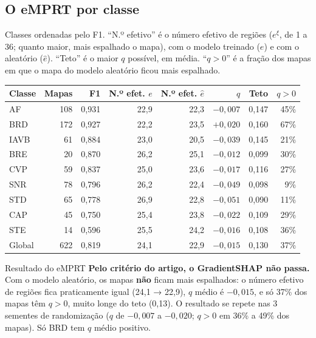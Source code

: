 \documentclass[11pt,a4paper]{article}
\begin{document}
\subsection{O eMPRT por classe}
Classes ordenadas pelo F1. “N.º efetivo” é o número efetivo de regiões ($e^{\xi}$, de 1 a 36; quanto maior, mais espalhado o mapa), com o modelo treinado ($e$) e com o aleatório ($\hat{e}$). “Teto” é o maior $q$ possível, em média. “$q > 0$” é a fração dos mapas em que o mapa do modelo aleatório ficou mais espalhado.
\begin{center}\small
\setlength{\tabcolsep}{5pt}
\begin{tabular}{lrrrrrrr}
\toprule
\textbf{Classe} & \textbf{Mapas} & \textbf{F1} & \textbf{N.º efet. $e$} & \textbf{N.º efet. $\hat{e}$} & \textbf{$q$} & \textbf{Teto} & \textbf{$q > 0$} \\
\midrule
AF   & 108 & 0,931 & 22,9 & 22,3 & $-0{,}007$ & 0,147 & 45\% \\
BRD  & 172 & 0,927 & 22,2 & 23,5 & $+0{,}020$ & 0,160 & 67\% \\
IAVB &  61 & 0,884 & 23,0 & 20,5 & $-0{,}039$ & 0,145 & 21\% \\
BRE  &  20 & 0,870 & 26,2 & 25,1 & $-0{,}012$ & 0,099 & 30\% \\
CVP  &  59 & 0,837 & 25,0 & 23,6 & $-0{,}017$ & 0,116 & 27\% \\
SNR  &  78 & 0,796 & 26,2 & 22,4 & $-0{,}049$ & 0,098 &  9\% \\
STD  &  65 & 0,778 & 26,9 & 22,8 & $-0{,}051$ & 0,090 & 11\% \\
CAP  &  45 & 0,750 & 25,4 & 23,8 & $-0{,}022$ & 0,109 & 29\% \\
STE  &  14 & 0,596 & 25,5 & 24,2 & $-0{,}016$ & 0,108 & 36\% \\
\midrule
Global & 622 & 0,819 & 24,1 & 22,9 & $-0{,}015$ & 0,130 & 37\% \\
\bottomrule
\end{tabular}
\end{center}

\begin{infobox}[warn]{Resultado do eMPRT}
\textbf{Pelo critério do artigo, o GradientSHAP não passa.} Com o modelo aleatório, os mapas \textbf{não} ficam mais espalhados: o número efetivo de regiões fica praticamente igual (24,1 → 22,9), $q$ médio é $-0{,}015$, e só 37\% dos mapas têm $q > 0$, muito longe do teto (0,13). O resultado se repete nas 3 sementes de randomização ($q$ de $-0{,}007$ a $-0{,}020$; $q > 0$ em 36\% a 49\% dos mapas). Só BRD tem $q$ médio positivo.
\end{infobox}
\end{document}
